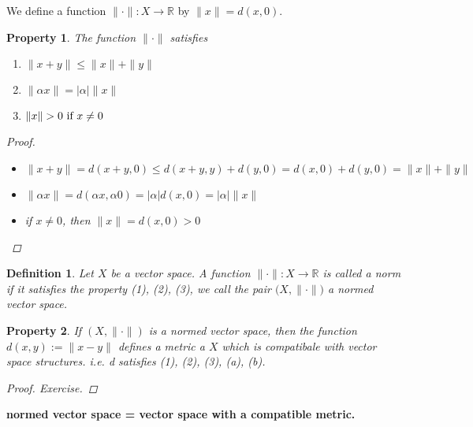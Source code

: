 \documentclass{article}
\newtheorem*{property}{Property}
\newtheorem*{definition}{Definition}
\begin{document}
We define a function $\|\cdot\|:X \rightarrow \mathbb{R}$ by $\|x\|=d(x, 0)$.
\begin{property}
    The function $\|\cdot\|$ satisfies
    \begin{enumerate}
        \item $\|x + y\| \le \|x\| + \|y\|$
        \item $\|\alpha x\| = |\alpha|\|x\|$
        \item $\|x\| > 0 \textnormal{ if } x \ne 0$
    \end{enumerate}
    \begin{proof} \hfill
        \begin{itemize}
            \item $\|x + y\|=d(x+y, 0) \le d(x+y, y) + d(y, 0) = d(x, 0) + d(y, 0) = \|x\| + \|y\|$
            \item $\|\alpha x\| = d(\alpha x, \alpha 0) = |\alpha|d(x, 0) = |\alpha|\|x\|$
            \item if $x \ne 0$, then $\|x\|=d(x, 0) > 0$
        \end{itemize}
    \end{proof}
\end{property}
\begin{definition}
    Let $X$ be a vector space. A function $\|\cdot\|: X \rightarrow \mathbb{R}$ is called a norm
    if it satisfies the property (1), (2), (3), we call the pair $\bigl(X, \|\cdot\|\bigr)$ a normed vector space.
\end{definition}
\begin{property}
If $(X, \|\cdot\|)$ is a normed vector space, then the function $d(x, y):=\|x-y\|$
defines a metric a $X$ which is compatibale with vector space structures.
i.e. d satisfies (1), (2), (3), (a), (b).
\begin{proof}
    Exercise.
\end{proof}
\end{property}
\textbf{normed vector space = vector space with a compatible metric.}
\end{document}
